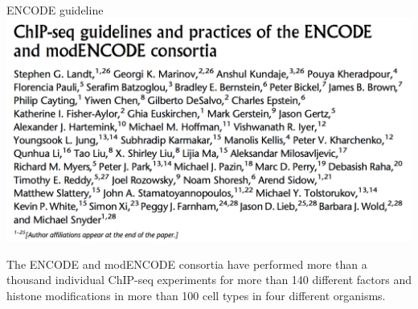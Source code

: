 \documentclass{beamer}
\begin{document}
\begin{frame}{ENCODE guideline}
\includegraphics[width=\linewidth]{paperENCODE.png}
\end{frame}

\begin{frame}
The ENCODE and modENCODE consortia have performed more than a thousand individual ChIP-seq experiments for more than 140 different factors and histone modifications in more than 100 cell types in four different organisms.
\end{frame}

\begin{frame}
\end{frame}
\end{document}
